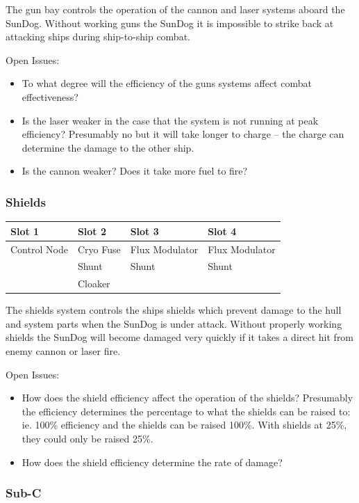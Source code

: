 The gun bay controls the operation of the cannon and laser systems aboard
the SunDog.  Without working guns the SunDog it is impossible to strike
back at attacking ships during ship-to-ship combat.

Open Issues:
\begin{itemize}
\item To what degree will the efficiency of the guns systems affect
combat effectiveness?
\item Is the laser weaker in the case that the system is not running
at peak efficiency?  Presumably no but it will take longer to charge --
the charge can determine the damage to the other ship.
\item Is the cannon weaker?  Does it take more fuel to fire?
\end{itemize}

\subsubsection{Shields}

\begin{tabular}{ | p{2.5cm} | p{2.5cm} | p{2.5cm} | p{2.5cm} | }
\hline
Slot 1 & Slot 2 & Slot 3 & Slot 4 \\ \hline
Control Node & Cryo Fuse & Flux Modulator & Flux Modulator \\
& Shunt & Shunt & Shunt \\
& Cloaker & & \\
\hline
\end{tabular}

The shields system controls the ships shields which prevent damage to
the hull and system parts when the SunDog is under attack.  Without
properly working shields the SunDog will become damaged very quickly
if it takes a direct hit from enemy cannon or laser fire.

Open Issues:
\begin{itemize}
\item How does the shield efficiency affect the operation of the shields?
Presumably the efficiency determines the percentage to what the shields can
be raised to:  ie. 100\% efficiency and the shields can be raised 100\%.
With shields at 25\%, they could only be raised 25\%.
\item How does the shield efficiency determine the rate of damage?
\end{itemize}

\subsubsection{Sub-C}

